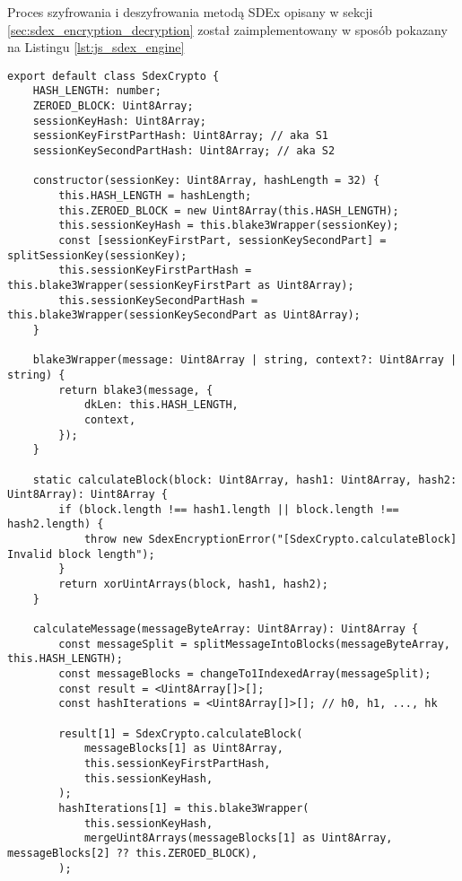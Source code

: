 \documentclass[../main.tex]{subfiles}
\begin{document}
Proces szyfrowania i deszyfrowania metodą SDEx opisany w sekcji \ref{sec:sdex_encryption_decryption} został zaimplementowany w sposób pokazany na Listingu \ref{lst:js_sdex_engine}

\begin{lstlisting}[caption={Szyfrowanie i deszyfrowanie metodą SDEx - implementacja},label={lst:js_sdex_engine}]
export default class SdexCrypto {
    HASH_LENGTH: number;
    ZEROED_BLOCK: Uint8Array;
    sessionKeyHash: Uint8Array;
    sessionKeyFirstPartHash: Uint8Array; // aka S1
    sessionKeySecondPartHash: Uint8Array; // aka S2

    constructor(sessionKey: Uint8Array, hashLength = 32) {
        this.HASH_LENGTH = hashLength;
        this.ZEROED_BLOCK = new Uint8Array(this.HASH_LENGTH);
        this.sessionKeyHash = this.blake3Wrapper(sessionKey);
        const [sessionKeyFirstPart, sessionKeySecondPart] = splitSessionKey(sessionKey);
        this.sessionKeyFirstPartHash = this.blake3Wrapper(sessionKeyFirstPart as Uint8Array);
        this.sessionKeySecondPartHash = this.blake3Wrapper(sessionKeySecondPart as Uint8Array);
    }

    blake3Wrapper(message: Uint8Array | string, context?: Uint8Array | string) {
        return blake3(message, {
            dkLen: this.HASH_LENGTH,
            context,
        });
    }

    static calculateBlock(block: Uint8Array, hash1: Uint8Array, hash2: Uint8Array): Uint8Array {
        if (block.length !== hash1.length || block.length !== hash2.length) {
            throw new SdexEncryptionError("[SdexCrypto.calculateBlock] Invalid block length");
        }
        return xorUintArrays(block, hash1, hash2);
    }

    calculateMessage(messageByteArray: Uint8Array): Uint8Array {
        const messageSplit = splitMessageIntoBlocks(messageByteArray, this.HASH_LENGTH);
        const messageBlocks = changeTo1IndexedArray(messageSplit);
        const result = <Uint8Array[]>[];
        const hashIterations = <Uint8Array[]>[]; // h0, h1, ..., hk

        result[1] = SdexCrypto.calculateBlock(
            messageBlocks[1] as Uint8Array,
            this.sessionKeyFirstPartHash,
            this.sessionKeyHash,
        );
        hashIterations[1] = this.blake3Wrapper(
            this.sessionKeyHash,
            mergeUint8Arrays(messageBlocks[1] as Uint8Array, messageBlocks[2] ?? this.ZEROED_BLOCK),
        );


\end{lstlisting}
\end{document}
